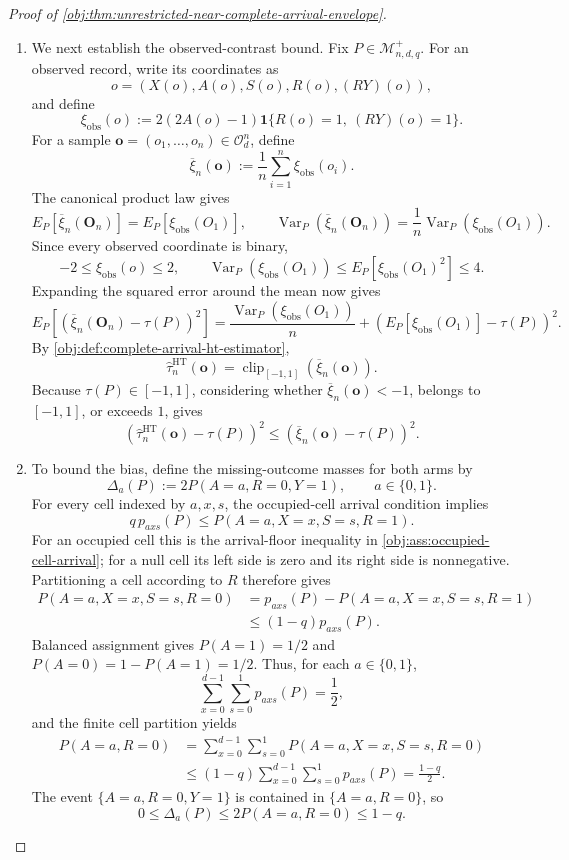 \documentclass[11pt]{article}
\begin{document}
\begin{proof}[Proof of \cref{obj:thm:unrestricted-near-complete-arrival-envelope}]
\begin{enumerate}
\item We next establish the observed-contrast bound. Fix
\(P\in\mathcal M^{+}_{n,d,q}\). For an observed record, write its coordinates as
\[
o=(X(o),A(o),S(o),R(o),(RY)(o)),
\]
and define
\[
\xi_{\mathrm{obs}}(o)
:=
2(2A(o)-1)\mathbf1\{R(o)=1,\ (RY)(o)=1\}.
\]
For a sample \(\mathbf o=(o_1,\ldots,o_n)\in\mathcal O_d^n\), define
\[
\overline\xi_n(\mathbf o)
:=
\frac1n\sum_{i=1}^n\xi_{\mathrm{obs}}(o_i).
\]
The canonical product law gives
\[
E_P[\overline\xi_n(\mathbf O_n)]
=E_P[\xi_{\mathrm{obs}}(O_1)],
\qquad
\operatorname{Var}_P(\overline\xi_n(\mathbf O_n))
=\frac1n\operatorname{Var}_P(\xi_{\mathrm{obs}}(O_1)).
\]
Since every observed coordinate is binary,
\[
-2\le\xi_{\mathrm{obs}}(o)\le2,
\qquad
\operatorname{Var}_P(\xi_{\mathrm{obs}}(O_1))
\le E_P[\xi_{\mathrm{obs}}(O_1)^2]\le4.
\]
Expanding the squared error around the mean now gives
\[
E_P\!\left[
\left(\overline\xi_n(\mathbf O_n)-\tau(P)\right)^2
\right]
=
\frac{\operatorname{Var}_P(\xi_{\mathrm{obs}}(O_1))}{n}
+
\left(E_P[\xi_{\mathrm{obs}}(O_1)]-\tau(P)\right)^2.
\]
By \cref{obj:def:complete-arrival-ht-estimator},
\[
\widehat\tau^{\mathrm{HT}}_n(\mathbf o)
=
\operatorname{clip}_{[-1,1]}(\overline\xi_n(\mathbf o)).
\]
Because \(\tau(P)\in[-1,1]\), considering whether
\(\overline\xi_n(\mathbf o)<-1\), belongs to \([-1,1]\), or exceeds \(1\), gives
\[
\left(
\widehat\tau^{\mathrm{HT}}_n(\mathbf o)-\tau(P)
\right)^2
\le
\left(\overline\xi_n(\mathbf o)-\tau(P)\right)^2.
\]

\item To bound the bias, define the missing-outcome masses for both arms by
\[
\Delta_a(P)
:=
2P(A=a,R=0,Y=1),
\qquad a\in\{0,1\}.
\]
For every cell indexed by \(a,x,s\), the occupied-cell arrival condition implies
\[
q\,p_{axs}(P)
\le P(A=a,X=x,S=s,R=1).
\]
For an occupied cell this is the arrival-floor inequality in
\cref{obj:ass:occupied-cell-arrival}; for a null cell its left side is zero and its right side is nonnegative. Partitioning a cell according to \(R\) therefore gives
\[
\begin{aligned}
P(A=a,X=x,S=s,R=0)
&=
p_{axs}(P)-P(A=a,X=x,S=s,R=1)\\
&\le(1-q)p_{axs}(P).
\end{aligned}
\]
Balanced assignment gives \(P(A=1)=1/2\) and
\(P(A=0)=1-P(A=1)=1/2\). Thus, for each \(a\in\{0,1\}\),
\[
\sum_{x=0}^{d-1}\sum_{s=0}^{1}p_{axs}(P)=\frac12,
\]
and the finite cell partition yields
\[
\begin{aligned}
P(A=a,R=0)
&=
\sum_{x=0}^{d-1}\sum_{s=0}^{1}
P(A=a,X=x,S=s,R=0)\\
&\le
(1-q)\sum_{x=0}^{d-1}\sum_{s=0}^{1}p_{axs}(P)
=\frac{1-q}{2}.
\end{aligned}
\]
The event \(\{A=a,R=0,Y=1\}\) is contained in \(\{A=a,R=0\}\), so
\[
0\le\Delta_a(P)\le2P(A=a,R=0)\le1-q.
\]


\end{enumerate}
\end{proof}
\end{document}
